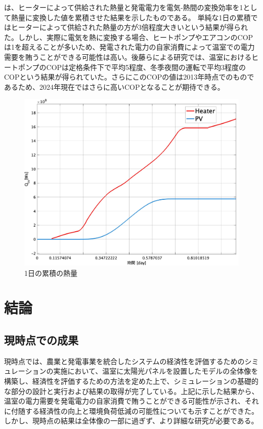 \documentclass[uplatex,dvipdfmx,nomag,a4paper,oneside,onecolumn,12pt]{bxjsreport} %
\begin{document}
は、ヒーターによって供給された熱量と発電電力を電気-熱間の変換効率を1として熱量に変換した値を累積させた結果を示したものである。
単純な1日の累積ではヒーターによって供給された熱量の方が3倍程度大きいという結果が得られた。しかし、実際に電気を熱に変換する場合、ヒートポンプやエアコンのCOPは1を超えることが多いため、発電された電力の自家消費によって温室での電力需要を賄うことができる可能性は高い。後藤らによる研究\cite{Cop2013}では、温室におけるヒートポンプのCOPは定格条件下で平均5程度、冬季夜間の運転で平均3程度のCOPという結果が得られていた。さらにこのCOPの値は2013年時点でのものであるため、2024年現在ではさらに高いCOPとなることが期待できる。

\begin{figure}[ht]
    \centering
    \includegraphics[width=0.8\linewidth]{fig/Qintotal.jpg}
    \caption{1日の累積の熱量}
    \label{fig:QinTotal}
\end{figure}


\chapter{結論}
\section{現時点での成果}
現時点では、農業と発電事業を統合したシステムの経済性を評価するためのシミュレーションの実施において、温室に太陽光パネルを設置したモデルの全体像を構築し、経済性を評価するための方法を定めた上で、シミュレーションの基礎的な部分の設計と実行および結果の取得が完了している。上記に示した結果から、温室の電力需要を発電電力の自家消費で賄うことができる可能性が示され、それに付随する経済性の向上と環境負荷低減の可能性についても示すことができた。しかし、現時点の結果は全体像の一部に過ぎず、より詳細な研究が必要である。
\end{document}
